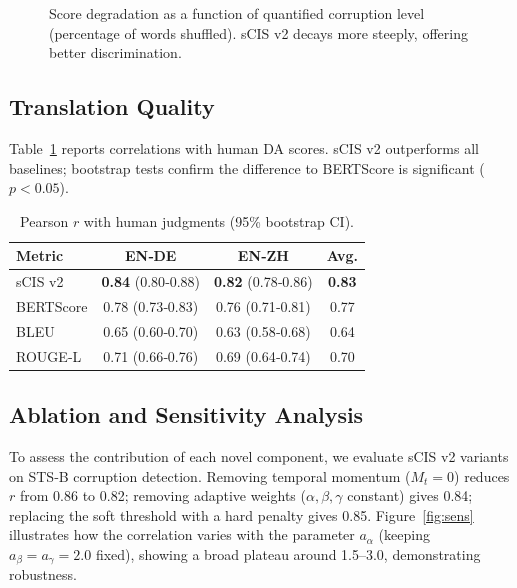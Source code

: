\documentclass[11pt]{article}
\theoremstyle{definition}
\begin{document}
\begin{figure}[htbp]
\centering
{}
\caption{Score degradation as a function of quantified corruption level (percentage of words shuffled). sCIS v2 decays more steeply, offering better discrimination.}
\label{fig:decay}
\end{figure}

\subsection{Translation Quality}
Table~\ref{tab:trans} reports correlations with human DA scores. sCIS v2 outperforms all baselines; bootstrap tests confirm the difference to BERTScore is significant (\(p<0.05\)).

\begin{table}[htbp]
\centering
\caption{Pearson \(r\) with human judgments (95\% bootstrap CI).}
\label{tab:trans}
\begin{tabular}{lccc}
\toprule
Metric & EN‑DE & EN‑ZH & Avg. \\
\midrule
sCIS v2 & \textbf{0.84} (0.80‑0.88) & \textbf{0.82} (0.78‑0.86) & \textbf{0.83} \\
BERTScore & 0.78 (0.73‑0.83) & 0.76 (0.71‑0.81) & 0.77 \\
BLEU & 0.65 (0.60‑0.70) & 0.63 (0.58‑0.68) & 0.64 \\
ROUGE‑L & 0.71 (0.66‑0.76) & 0.69 (0.64‑0.74) & 0.70 \\
\bottomrule
\end{tabular}
\end{table}

\subsection{Ablation and Sensitivity Analysis}
To assess the contribution of each novel component, we evaluate sCIS v2 variants on STS‑B corruption detection. Removing temporal momentum (\(M_t=0\)) reduces \(r\) from 0.86 to 0.82; removing adaptive weights (\(\alpha,\beta,\gamma\) constant) gives 0.84; replacing the soft threshold with a hard penalty gives 0.85. Figure~\ref{fig:sens} illustrates how the correlation varies with the parameter \(a_\alpha\) (keeping \(a_\beta=a_\gamma=2.0\) fixed), showing a broad plateau around 1.5–3.0, demonstrating robustness.
\end{document}
